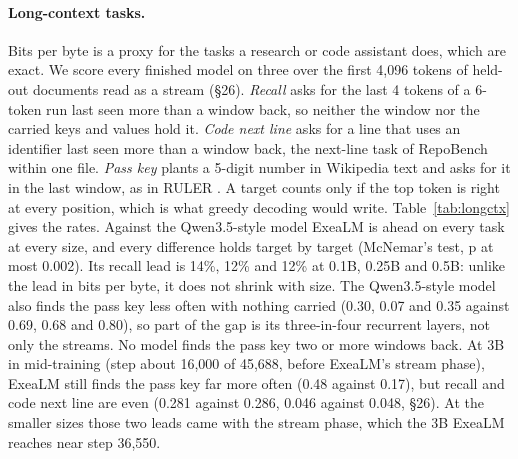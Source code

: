 \documentclass[10pt,twocolumn,letterpaper]{article}
\newcommand{\sect}[1]{\S#1}
\begin{document}
\paragraph{Long-context tasks.}
Bits per byte is a proxy for the tasks a research or code assistant does, which are exact.
We score every finished model on three over the first 4,096 tokens of held-out documents read as a stream (\sect{26}).
\emph{Recall} asks for the last 4 tokens of a 6-token run last seen more than a window back, so neither the window nor the carried keys and values hold it.
\emph{Code next line} asks for a line that uses an identifier last seen more than a window back, the next-line task of RepoBench \citep{liu2023repobench} within one file.
\emph{Pass key} plants a 5-digit number in Wikipedia text and asks for it in the last window, as in RULER \citep{hsieh2024ruler}.
A target counts only if the top token is right at every position, which is what greedy decoding would write.
Table~\ref{tab:longctx} gives the rates.
Against the Qwen3.5-style model ExeaLM is ahead on every task at every size, and every difference holds target by target (McNemar's test, p at most 0.002).
Its recall lead is 14\%, 12\% and 12\% at 0.1B, 0.25B and 0.5B: unlike the lead in bits per byte, it does not shrink with size.
The Qwen3.5-style model also finds the pass key less often with nothing carried (0.30, 0.07 and 0.35 against 0.69, 0.68 and 0.80), so part of the gap is its three-in-four recurrent layers, not only the streams.
No model finds the pass key two or more windows back.
At 3B in mid-training (step about 16,000 of 45,688, before ExeaLM's stream phase), ExeaLM still finds the pass key far more often (0.48 against 0.17), but recall and code next line are even (0.281 against 0.286, 0.046 against 0.048, \sect{26}). At the smaller sizes those two leads came with the stream phase, which the 3B ExeaLM reaches near step 36,550.
\end{document}

